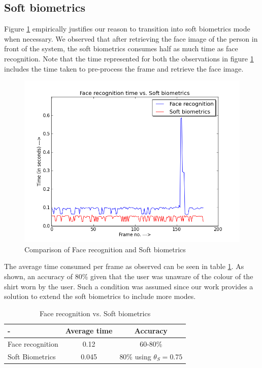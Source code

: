 \documentclass[%
        final,
        notitlepage,
        narroweqnarray,
        inline,
        ]{ieee}
\begin{document}
\subsection{Soft biometrics}
Figure \ref{fig:fsoft} empirically justifies our reason to transition into soft biometrics mode when necessary.
We observed that after retrieving the face image of the person in front of the system, the soft biometrics consumes half as much time as face recognition.
Note that the time represented for both the observations in figure \ref{fig:fsoft} includes the time taken to pre-process the frame and retrieve the face image.
\begin{figure}[h!]
	\centering
	\includegraphics[scale=0.40]{img/face_vs_soft.png}
	\caption{Comparison of Face recognition and Soft biometrics}
	\label{fig:fsoft}
\end{figure}
The average time consumed per frame as observed can be seen in table \ref{tab:frsb}.
As shown, an accuracy of 80\% given that the user was unaware of the colour of the shirt worn by the user.
Such a condition was assumed since our work provides a solution to extend the soft biometrics to include more modes.
\begin{table}[htp]
	\centering
	\caption{Face recognition vs. Soft biometrics}
	\begin{tabular}{||l|c|c||} \hline \hline
	-                  &  Average time  &  Accuracy \\ \hline
	Face recognition   &  0.12          &  60-80\% \\ \hline
	Soft Biometrics    &  0.045         &  80\% using $\theta_{S}=0.75$ \\ \hline \hline
	\end{tabular}
	\label{tab:frsb}
\end{table}
\end{document}
